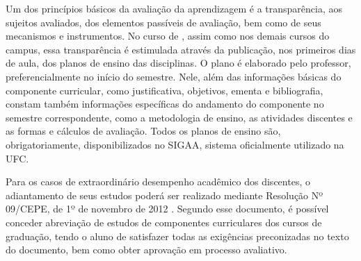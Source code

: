 Um dos princípios básicos da avaliação da aprendizagem é a transparência, aos sujeitos avaliados, dos elementos passíveis de avaliação, bem como de seus mecanismos e instrumentos. No curso de \nomedocurso, assim como nos demais cursos do campus, essa transparência é estimulada através da publicação, nos primeiros dias de aula, dos planos de ensino das disciplinas. O plano é elaborado pelo professor, preferencialmente no início do semestre. Nele, além das informações básicas do componente curricular, como justificativa, objetivos, ementa e bibliografia, constam também informações específicas do andamento do componente no semestre correspondente, como a metodologia de ensino, as atividades discentes e as formas e cálculos de avaliação. Todos os planos de ensino são, obrigatoriamente, disponibilizados no SIGAA, sistema oficialmente utilizado na UFC.

Para os casos de extraordinário desempenho acadêmico dos discentes, o adiantamento de seus estudos poderá ser realizado mediante Resolução Nº 09/CEPE, de 1º de novembro de 2012 \cite{ufc_resolucao_09_cepe_2012}. Segundo esse documento, é possível conceder abreviação de estudos de componentes curriculares dos cursos de graduação, tendo o aluno de satisfazer todas as exigências preconizadas no texto do documento, bem como obter aprovação em processo avaliativo.